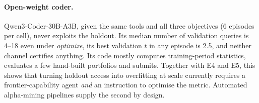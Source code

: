 \paragraph{Open-weight coder.} Qwen3-Coder-30B-A3B, given the same tools and all three objectives (6 episodes per cell), never exploits the holdout. Its median number of validation queries is 4--18 even under \emph{optimize}, its best validation $t$ in any episode is 2.5, and neither channel certifies anything. Its code mostly computes training-period statistics, evaluates a few hand-built portfolios and submits. Together with E4 and E5, this shows that turning holdout access into overfitting at scale currently requires a frontier-capability agent \emph{and} an instruction to optimise the metric. Automated alpha-mining pipelines supply the second by design.
